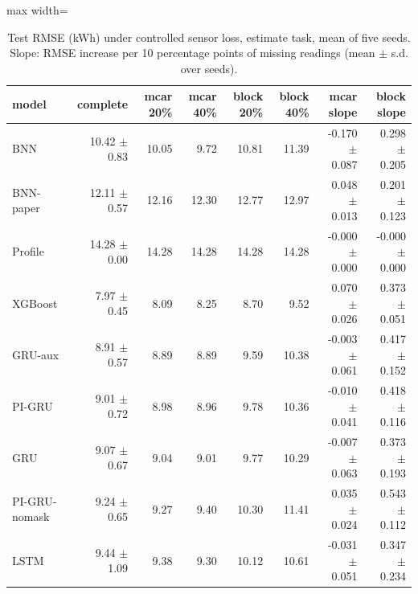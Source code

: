 \begin{table}[H]
\centering\small
\caption{Test RMSE (kWh) under controlled sensor loss, estimate task, mean of five seeds. Slope: RMSE increase per 10 percentage points of missing readings (mean $\pm$ s.d. over seeds).}\label{tab:robust_estimate}
\begin{adjustbox}{max width=\textwidth}
\begin{tabular}{lrrrrrrr}
\toprule
model & complete & mcar 20\% & mcar 40\% & block 20\% & block 40\% & mcar slope & block slope \\
\midrule
BNN & 10.42 $\pm$ 0.83 & 10.05 & 9.72 & 10.81 & 11.39 & -0.170 $\pm$ 0.087 & 0.298 $\pm$ 0.205 \\
BNN-paper & 12.11 $\pm$ 0.57 & 12.16 & 12.30 & 12.77 & 12.97 & 0.048 $\pm$ 0.013 & 0.201 $\pm$ 0.123 \\
Profile & 14.28 $\pm$ 0.00 & 14.28 & 14.28 & 14.28 & 14.28 & -0.000 $\pm$ 0.000 & -0.000 $\pm$ 0.000 \\
XGBoost & 7.97 $\pm$ 0.45 & 8.09 & 8.25 & 8.70 & 9.52 & 0.070 $\pm$ 0.026 & 0.373 $\pm$ 0.051 \\
GRU-aux & 8.91 $\pm$ 0.57 & 8.89 & 8.89 & 9.59 & 10.38 & -0.003 $\pm$ 0.061 & 0.417 $\pm$ 0.152 \\
PI-GRU & 9.01 $\pm$ 0.72 & 8.98 & 8.96 & 9.78 & 10.36 & -0.010 $\pm$ 0.041 & 0.418 $\pm$ 0.116 \\
GRU & 9.07 $\pm$ 0.67 & 9.04 & 9.01 & 9.77 & 10.29 & -0.007 $\pm$ 0.063 & 0.373 $\pm$ 0.193 \\
PI-GRU-nomask & 9.24 $\pm$ 0.65 & 9.27 & 9.40 & 10.30 & 11.41 & 0.035 $\pm$ 0.024 & 0.543 $\pm$ 0.112 \\
LSTM & 9.44 $\pm$ 1.09 & 9.38 & 9.30 & 10.12 & 10.61 & -0.031 $\pm$ 0.051 & 0.347 $\pm$ 0.234 \\
\bottomrule
\end{tabular}
\end{adjustbox}
\end{table}
